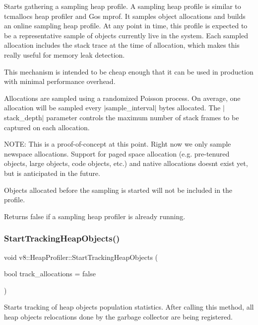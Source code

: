 Starts gathering a sampling heap profile. A sampling heap profile is similar to tcmalloc\textquotesingle{}s heap profiler and Go\textquotesingle{}s mprof. It samples object allocations and builds an online \textquotesingle{}sampling\textquotesingle{} heap profile. At any point in time, this profile is expected to be a representative sample of objects currently live in the system. Each sampled allocation includes the stack trace at the time of allocation, which makes this really useful for memory leak detection.

This mechanism is intended to be cheap enough that it can be used in production with minimal performance overhead.

Allocations are sampled using a randomized Poisson process. On average, one allocation will be sampled every $\vert$sample\+\_\+interval$\vert$ bytes allocated. The $\vert$stack\+\_\+depth$\vert$ parameter controls the maximum number of stack frames to be captured on each allocation.

N\+O\+TE\+: This is a proof-\/of-\/concept at this point. Right now we only sample newspace allocations. Support for paged space allocation (e.\+g. pre-\/tenured objects, large objects, code objects, etc.) and native allocations doesn\textquotesingle{}t exist yet, but is anticipated in the future.

Objects allocated before the sampling is started will not be included in the profile.

Returns false if a sampling heap profiler is already running. \mbox{\label{classv8_1_1HeapProfiler_a02917db133b7efd468c9c73075a15171}} 
\subsubsection{\texorpdfstring{Start\+Tracking\+Heap\+Objects()}{StartTrackingHeapObjects()}}
{\footnotesize\ttfamily void v8\+::\+Heap\+Profiler\+::\+Start\+Tracking\+Heap\+Objects (\begin{DoxyParamCaption}\item[{bool}]{track\+\_\+allocations = {\ttfamily false} }\end{DoxyParamCaption})}

Starts tracking of heap objects population statistics. After calling this method, all heap objects relocations done by the garbage collector are being registered.

